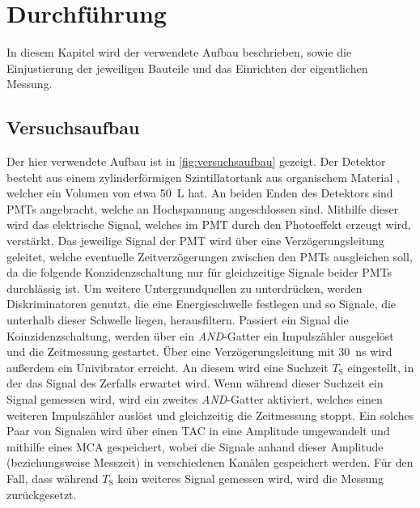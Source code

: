 \section{Durchführung}
\label{sec:durchfuehrung}

In diesem Kapitel wird der verwendete Aufbau beschrieben,
sowie die Einjustierung der jeweiligen Bauteile und das Einrichten der eigentlichen Messung. 


\subsection{Versuchsaufbau}

Der hier verwendete Aufbau ist in \autoref{fig:versuchsaufbau} gezeigt.
Der Detektor besteht aus einem zylinderförmigen Szintillatortank aus organischem Material \cite{kolanoskiwermes},
welcher ein Volumen von etwa \SI{50}{\liter} hat.
An beiden Enden des Detektors sind \acp{PMT} \cite{wrleo} angebracht,
welche an Hochspannung angeschlossen sind.
Mithilfe dieser wird das elektrische Signal,
welches im \ac{PMT} durch den Photoeffekt erzeugt wird,
verstärkt.
Das jeweilige Signal der \ac{PMT} wird über eine Verzögerungsleitung geleitet,
welche eventuelle Zeitverzögerungen zwischen den \acp{PMT} ausgleichen soll,
da die folgende Konzidenzschaltung nur für gleichzeitige Signale beider \acp{PMT} durchlässig ist.
Um weitere Untergrundquellen zu unterdrücken,
werden Diskriminatoren genutzt,
die eine Energieschwelle festlegen und so Signale,
die unterhalb dieser Schwelle liegen,
herausfiltern.
Passiert ein Signal die Koinzidenzschaltung,
werden über ein \textit{AND}-Gatter ein Impulszähler ausgelöst und die Zeitmessung gestartet.
Über eine Verzögerungsleitung mit \SI{30}{\nano\second} wird außerdem ein Univibrator erreicht.
An diesem wird eine Suchzeit $T_\text{S}$ eingestellt,
in der das Signal des Zerfalls erwartet wird.
Wenn während dieser Suchzeit ein Signal gemessen wird,
wird ein zweites \textit{AND}-Gatter aktiviert,
welches einen weiteren Impulszähler auslöst und gleichzeitig die Zeitmessung stoppt.
Ein solches Paar von Signalen wird über einen \ac{TAC} \cite{wrleo} in eine Amplitude umgewandelt und mithilfe eines \ac{MCA} \cite{wrleo} gespeichert, %
wobei die Signale anhand dieser Amplitude (beziehungsweise Messzeit)
in verschiedenen Kanälen gespeichert werden.
Für den Fall,
dass während $T_\text{S}$ kein weiteres Signal gemessen wird,
wird die Messung zurückgesetzt.

